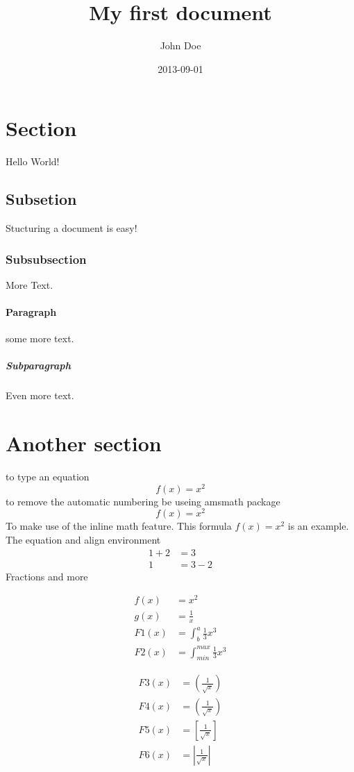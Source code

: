 \documentclass[12pt]{article}
\title{My first document}
\date{2013-09-01}
\author{John Doe}
\begin{document}
  \maketitle

  \newpage
{}
\section{Section}
Hello World!
\subsection{Subsetion}
Stucturing a document is easy!
\subsubsection{Subsubsection}
More Text.
\paragraph{Paragraph}
some more text.
\subparagraph{Subparagraph}
Even more text.
\section{Another section}

  \newpage
to type an equation
\begin{equation}
  f(x) = x^2
\end{equation}
to remove the automatic numbering be useing {amsmath} package
\begin{equation*}
  f(x) = x^2
\end{equation*}
To make use of the inline math feature.
This formula $f(x) = x^2$ is an example.
The equation and align environment
\begin{align*}
    1 + 2 &= 3\\
    1 &= 3 - 2
\end{align*}
 Fractions and more

\begin{align*}
    f(x) &= x^2\\
    g(x) &= \frac{1}{x}\\
    F1(x) &= \int^a_b \frac{1}{3}x^3\\  %
    F2(x) &= \int_{min}^{max} \frac{1}{3}x^3 %
\end{align*}
    
    
\begin{align*}
  F3(x) &= (\frac{1}{\sqrt{x}}) \\
  F4(x) &= \left( \frac{1}{\sqrt{x}} \right) \\
  F5(x) &= \left[ \frac{1}{\sqrt{x}} \right] \\
  F6(x) &= \left| \frac{1}{\sqrt{x}} \right|
\end{align*}
\end{document}
